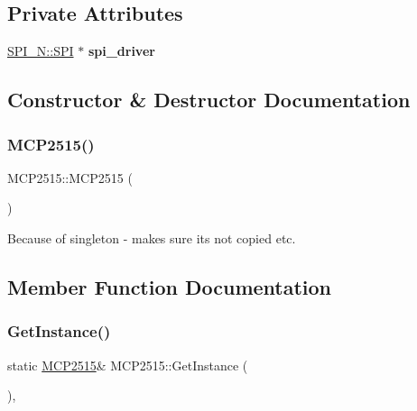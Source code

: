 \subsection*{Private Attributes}
\begin{DoxyCompactItemize}
\item 
\hypertarget{class_m_c_p2515_a3a5ca0d606115f1551a06d871606540e}{}\label{class_m_c_p2515_a3a5ca0d606115f1551a06d871606540e} 
\hyperlink{class_s_p_i___n_1_1_s_p_i}{S\+P\+I\+\_\+\+N\+::\+S\+PI} $\ast$ {\bfseries spi\+\_\+driver}
\end{DoxyCompactItemize}


\subsection{Constructor \& Destructor Documentation}
\hypertarget{class_m_c_p2515_a8cd4111604b740feb758bd4d077f4fb8}{}\label{class_m_c_p2515_a8cd4111604b740feb758bd4d077f4fb8} 
\subsubsection{\texorpdfstring{M\+C\+P2515()}{MCP2515()}}
{\footnotesize\ttfamily M\+C\+P2515\+::\+M\+C\+P2515 (\begin{DoxyParamCaption}\item[{const \hyperlink{class_m_c_p2515}{M\+C\+P2515} \&}]{ }\end{DoxyParamCaption})\hspace{0.3cm}{\ttfamily [delete]}}

Because of singleton -\/ makes sure its not copied etc. 

\subsection{Member Function Documentation}
\hypertarget{class_m_c_p2515_a3f53839a9258086fd21e2fc4190de60d}{}\label{class_m_c_p2515_a3f53839a9258086fd21e2fc4190de60d} 
\subsubsection{\texorpdfstring{Get\+Instance()}{GetInstance()}}
{\footnotesize\ttfamily static \hyperlink{class_m_c_p2515}{M\+C\+P2515}\& M\+C\+P2515\+::\+Get\+Instance (\begin{DoxyParamCaption}{ }\end{DoxyParamCaption})\hspace{0.3cm}{\ttfamily [inline]}, {\ttfamily [static]}}

